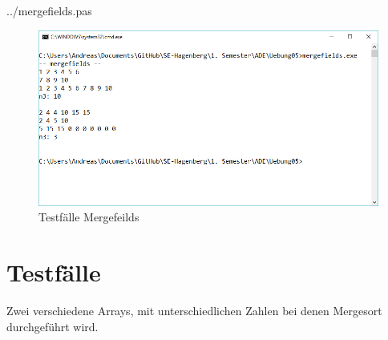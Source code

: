 {../mergefields.pas}
\begin{figure}[H]
	\centering
	\includegraphics[scale=0.75]{./pictures/mergefields.png}
	\caption{Testfälle Mergefeilds}
	\label{fig: mergefields}
\end{figure}

\section*{Testfälle}
Zwei verschiedene Arrays, mit unterschiedlichen Zahlen bei denen Mergesort durchgeführt wird.

\newpage
